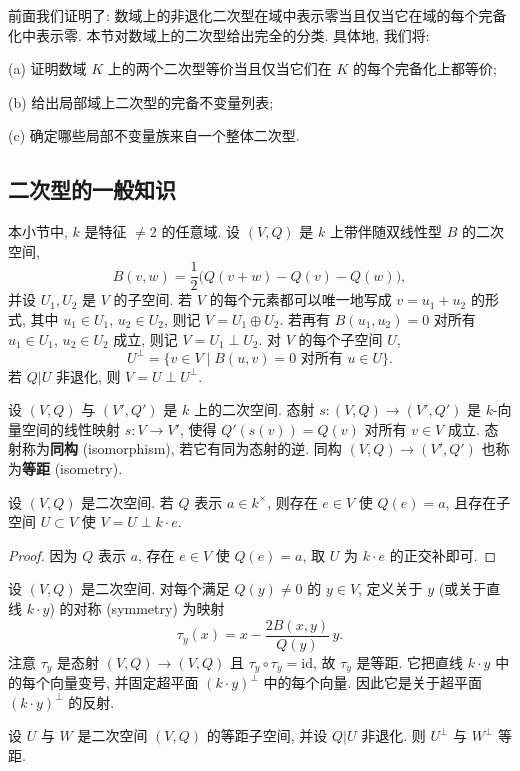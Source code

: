 前面我们证明了: 数域上的非退化二次型在域中表示零当且仅当它在域的每个完备化中表示零. 本节对数域上的二次型给出完全的分类. 具体地, 我们将:

(a) 证明数域 $K$ 上的两个二次型等价当且仅当它们在 $K$ 的每个完备化上都等价;

(b) 给出局部域上二次型的完备不变量列表;

(c) 确定哪些局部不变量族来自一个整体二次型.

\subsection*{二次型的一般知识}

本小节中, $k$ 是特征 $\ne 2$ 的任意域. 设 $(V,Q)$ 是 $k$ 上带伴随双线性型 $B$ 的二次空间,
\[
B(v,w)=\frac{1}{2}\big(Q(v+w)-Q(v)-Q(w)\big),
\]
并设 $U_1,U_2$ 是 $V$ 的子空间. 若 $V$ 的每个元素都可以唯一地写成 $v=u_1+u_2$ 的形式, 其中 $u_1\in U_1$, $u_2\in U_2$, 则记 $V=U_1\oplus U_2$. 若再有 $B(u_1,u_2)=0$ 对所有 $u_1\in U_1$, $u_2\in U_2$ 成立, 则记 $V=U_1\perp U_2$. 对 $V$ 的每个子空间 $U$,
\[
U^{\perp}=\{v\in V\mid B(u,v)=0 \text{ 对所有 } u\in U\}.
\]
若 $Q|U$ 非退化, 则 $V=U\perp U^{\perp}$.

设 $(V,Q)$ 与 $(V',Q')$ 是 $k$ 上的二次空间. 态射 $s\colon(V,Q)\to(V',Q')$ 是 $k$-向量空间的线性映射 $s\colon V\to V'$, 使得 $Q'(s(v))=Q(v)$ 对所有 $v\in V$ 成立. 态射称为\textbf{同构} (isomorphism), 若它有同为态射的逆. 同构 $(V,Q)\to(V',Q')$ 也称为\textbf{等距} (isometry).

\begin{proposition}\label{prop:viii.6.1}
设 $(V,Q)$ 是二次空间. 若 $Q$ 表示 $a\in k^{\times}$, 则存在 $e\in V$ 使 $Q(e)=a$, 且存在子空间 $U\subset V$ 使 $V=U\perp k\cdot e$.
\end{proposition}

\begin{proof}
因为 $Q$ 表示 $a$, 存在 $e\in V$ 使 $Q(e)=a$, 取 $U$ 为 $k\cdot e$ 的正交补即可.
\end{proof}

设 $(V,Q)$ 是二次空间. 对每个满足 $Q(y)\ne 0$ 的 $y\in V$, 定义关于 $y$ (或关于直线 $k\cdot y$) 的对称 (symmetry) 为映射
\[
\tau_{y}(x)=x-\frac{2B(x,y)}{Q(y)}\,y.
\]
注意 $\tau_y$ 是态射 $(V,Q)\to(V,Q)$ 且 $\tau_y\circ\tau_y=\mathrm{id}$, 故 $\tau_y$ 是等距. 它把直线 $k\cdot y$ 中的每个向量变号, 并固定超平面 $(k\cdot y)^{\perp}$ 中的每个向量. 因此它是关于超平面 $(k\cdot y)^{\perp}$ 的反射.

\begin{proposition}\label{prop:viii.6.2}
设 $U$ 与 $W$ 是二次空间 $(V,Q)$ 的等距子空间, 并设 $Q|U$ 非退化. 则 $U^{\perp}$ 与 $W^{\perp}$ 等距.
\end{proposition}

